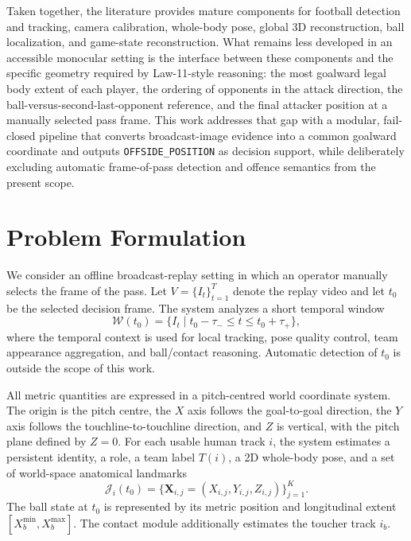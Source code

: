 \documentclass[runningheads]{llncs}
\begin{document}
Taken together, the literature provides mature components for football detection and tracking, camera calibration, whole-body pose, global 3D reconstruction, ball localization, and game-state reconstruction. What remains less developed in an accessible monocular setting is the interface between these components and the specific geometry required by Law-11-style reasoning: the most goalward legal body extent of each player, the ordering of opponents in the attack direction, the ball-versus-second-last-opponent reference, and the final attacker position at a manually selected pass frame. This work addresses that gap with a modular, fail-closed pipeline that converts broadcast-image evidence into a common goalward coordinate and outputs \texttt{OFFSIDE\_POSITION} as decision support, while deliberately excluding automatic frame-of-pass detection and offence semantics from the present scope.


\section{Problem Formulation}
\label{sec:problem}

We consider an offline broadcast-replay setting in which an operator manually selects the frame of the pass. Let $V=\{I_t\}_{t=1}^{T}$ denote the replay video and let $t_0$ be the selected decision frame. The system analyzes a short temporal window
\begin{equation}
\mathcal W(t_0)=\{I_t\mid t_0-\tau_- \le t \le t_0+\tau_+\},
\label{eq:replay_window}
\end{equation}
where the temporal context is used for local tracking, pose quality control, team appearance aggregation, and ball/contact reasoning. Automatic detection of $t_0$ is outside the scope of this work.

All metric quantities are expressed in a pitch-centred world coordinate system. The origin is the pitch centre, the $X$ axis follows the goal-to-goal direction, the $Y$ axis follows the touchline-to-touchline direction, and $Z$ is vertical, with the pitch plane defined by $Z=0$. For each usable human track $i$, the system estimates a persistent identity, a role, a team label $T(i)$, a 2D whole-body pose, and a set of world-space anatomical landmarks
\begin{equation}
\mathcal J_i(t_0)=\{\mathbf X_{i,j}=(X_{i,j},Y_{i,j},Z_{i,j})\}_{j=1}^{K}.
\label{eq:world_landmarks}
\end{equation}
The ball state at $t_0$ is represented by its metric position and longitudinal extent $[X_b^{\min},X_b^{\max}]$. The contact module additionally estimates the toucher track $i_b$.
\end{document}
